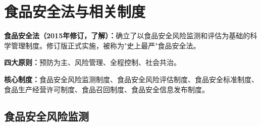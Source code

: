 \section{食品安全法与相关制度}

\begin{defbox}
\textbf{食品安全法（2015年修订，了解）：}确立了以食品安全风险监测和评估为基础的科学管理制度。修订版正式实施，被称为"史上最严"食品安全法。

\textbf{四大原则：}预防为主、风险管理、全程控制、社会共治。

\textbf{核心制度：}食品安全风险监测制度、食品安全风险评估制度、食品安全标准制度、食品生产经营许可制度、食品召回制度、食品安全信息发布制度。
\end{defbox}

\subsection{食品安全风险监测}

